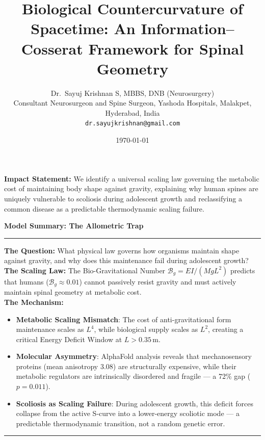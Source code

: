 \documentclass[11pt,a4paper]{article}
\title{Biological Countercurvature of Spacetime: An Information--Cosserat Framework for Spinal Geometry}
\author{Dr.~Sayuj Krishnan S, MBBS, DNB (Neurosurgery)\\
Consultant Neurosurgeon and Spine Surgeon, Yashoda Hospitals, Malakpet, Hyderabad, India\\
\texttt{dr.sayujkrishnan@gmail.com}
}
\date{\today}
\newenvironment{mathbox}[1][]
 {\par\vspace{\baselineskip}\noindent\textbf{#1}\par\noindent\rule{\textwidth}{0.4pt}\par\noindent}
 {\par\noindent\rule{\textwidth}{0.4pt}\vspace{\baselineskip}\par}
\begin{document}
\linenumbers
\maketitle



\vspace{0.5em}
\noindent\textbf{Impact Statement:} We identify a universal scaling law governing the metabolic cost of maintaining body shape against gravity, explaining why human spines are uniquely vulnerable to scoliosis during adolescent growth and reclassifying a common disease as a predictable thermodynamic scaling failure.
\vspace{0.5em}

\begin{mathbox}[Model Summary: The Allometric Trap]
\textbf{The Question:} What physical law governs how organisms maintain shape against gravity, and why does this maintenance fail during adolescent growth?\\[4pt]
\textbf{The Scaling Law:} The Bio-Gravitational Number $\mathcal{B}_g = EI/(MgL^2)$ predicts that humans ($\mathcal{B}_g \approx 0.01$) cannot passively resist gravity and must actively maintain spinal geometry at metabolic cost.\\[4pt]
\textbf{The Mechanism:}
\begin{itemize}
    \item \textbf{Metabolic Scaling Mismatch}: The cost of anti-gravitational form maintenance scales as $L^4$, while biological supply scales as $L^2$, creating a critical Energy Deficit Window at $L > 0.35$\,m.
    \item \textbf{Molecular Asymmetry}: AlphaFold analysis reveals that mechanosensory proteins (mean anisotropy 3.08) are structurally expensive, while their metabolic regulators are intrinsically disordered and fragile --- a 72\% gap ($p = 0.011$).
    \item \textbf{Scoliosis as Scaling Failure}: During adolescent growth, this deficit forces collapse from the active S-curve into a lower-energy scoliotic mode --- a predictable thermodynamic transition, not a random genetic error.
\end{itemize}
\end{mathbox}

























\end{document}
